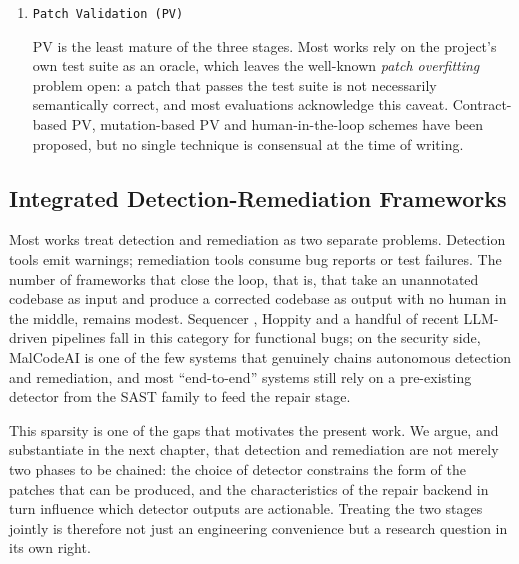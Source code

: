 \begin{enumerate}
Within our security-focused sample, AVATAR and Sorald exploit fix
patterns of static-analysis violations to suggest patches at the
SonarQube level
\citep{placeholder-avatar,placeholder-sorald}; AddressWatcher localises
memory-leak fixes through sanitiser feedback
\citep{placeholder-addresswatcher}; PRD recompiles partial binaries to
mitigate vulnerabilities without source. The reported success rates
fall between $34\%$ and $65\%$ of correct or partially-correct
patches, with the wide variance directly tied to dataset composition
and to the strictness of the patch-correctness criterion used.

 \item \texttt{Patch Validation (PV)}

PV is the least mature of the three stages. Most works rely on the
project's own test suite as an oracle, which leaves the well-known
\emph{patch overfitting} problem open: a patch that passes the test
suite is not necessarily semantically correct, and most evaluations
acknowledge this caveat. Contract-based PV, mutation-based PV and
human-in-the-loop schemes have been proposed, but no single technique
is consensual at the time of writing.

   
\end{enumerate}
\subsection{Integrated Detection-Remediation Frameworks}
\label{subsec:integrated-rw}

Most works treat detection and remediation as two separate problems.
Detection tools emit warnings; remediation tools consume bug reports or
test failures. The number of frameworks that close the loop, that is,
that take an unannotated codebase as input and produce a corrected
codebase as output with no human in the middle, remains modest.
Sequencer \citep{placeholder-sequencer}, Hoppity
\citep{placeholder-hoppity} and a handful of recent LLM-driven pipelines
fall in this category for functional bugs; on the security side,
MalCodeAI \citep{placeholder-malcodeai} is one of the few systems that
genuinely chains autonomous detection and remediation, and most
``end-to-end'' systems still rely on a pre-existing detector from the
SAST family to feed the repair stage.

This sparsity is one of the gaps that motivates the present work. We
argue, and substantiate in the next chapter, that detection and
remediation are not merely two phases to be chained: the choice of
detector constrains the form of the patches that can be produced, and
the characteristics of the repair backend in turn influence which
detector outputs are actionable. Treating the two stages jointly is
therefore not just an engineering convenience but a research question
in its own right.

